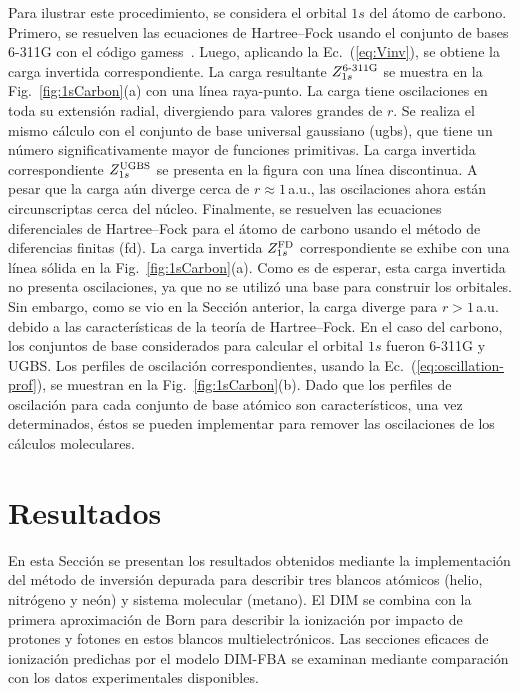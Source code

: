 Para ilustrar este procedimiento, se considera el orbital $1s$ del átomo 
de carbono. Primero, se resuelven las ecuaciones de Hartree--Fock usando 
el conjunto de bases \mbox{6-311G} con el código 
{\sc gamess}~\cite{Schmidt:93,Gordon:05}. Luego, aplicando la 
Ec.~(\ref{eq:Vinv}), se obtiene la carga invertida correspondiente. La 
carga resultante $Z_{1s}^{\mbox{\scriptsize 6-311G}}$ se muestra en la 
Fig.~\ref{fig:1sCarbon}(a) con una línea raya-punto. La carga tiene  
oscilaciones en toda su extensión radial, divergiendo para valores 
grandes de $r$. Se realiza el mismo cálculo con el conjunto de base 
universal gaussiano (\acs{ugbs}), que tiene un número significativamente 
mayor de funciones primitivas. La carga invertida correspondiente 
$Z_{1s}^{\mbox{\scriptsize UGBS}}$ se presenta en la figura con una línea 
discontinua. A pesar que la carga aún diverge cerca de 
$r\approx1\,$a.u., las oscilaciones ahora están circunscriptas cerca del 
núcleo. Finalmente, se resuelven las ecuaciones diferenciales de 
Hartree--Fock para el átomo de carbono usando el método de diferencias 
finitas (\acs{fd}). La carga invertida $Z_{1s}^{\mbox{\scriptsize FD}}$ 
correspondiente se exhibe con una línea sólida en la 
Fig.~\ref{fig:1sCarbon}(a). Como es de esperar, esta carga invertida no 
presenta oscilaciones, ya que no se utilizó una base para construir los 
orbitales. Sin embargo, como se vio en la Sección anterior, la carga 
diverge para $r>1\,$a.u. debido a las características 
de la teoría de Hartree--Fock. En el caso del carbono, los conjuntos de base considerados para 
calcular el orbital $1s$ fueron \mbox{6-311G} y UGBS. Los perfiles de 
oscilación correspondientes, usando la Ec.~(\ref{eq:oscillation-prof}), 
se muestran en la Fig.~\ref{fig:1sCarbon}(b). Dado que los perfiles de 
oscilación para cada conjunto de base atómico son característicos, una 
vez determinados, éstos se pueden implementar para remover las 
oscilaciones de los cálculos moleculares. 


\newpage
\section{Resultados}
\label{sec:dimresultados}

En esta Sección se presentan los resultados obtenidos mediante la  
implementación del método de inversión depurada para describir tres 
blancos atómicos (helio, nitrógeno y neón) y sistema molecular (metano). 
El DIM se combina con la primera aproximación de Born para describir la 
ionización por impacto de protones y fotones en estos blancos 
multielectrónicos. Las secciones eficaces de ionización predichas por el 
modelo DIM-FBA se examinan mediante comparación con los datos 
experimentales disponibles.

